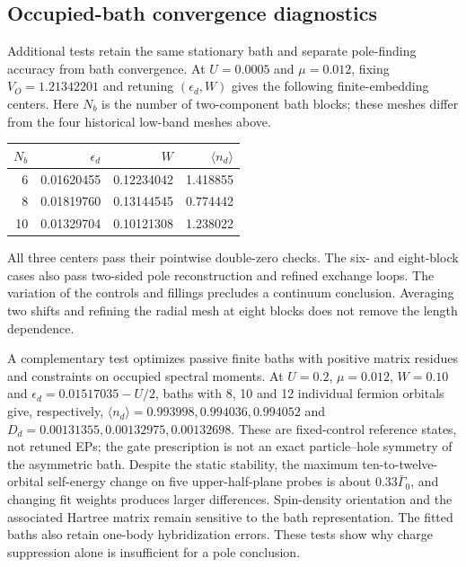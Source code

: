 \documentclass[%
  aps,physrev,onecolumn,10pt,amsmath,amssymb,superscriptaddress,longbibliography,floatfix
]{revtex4-2}
\begin{document}
\subsection{Occupied-bath convergence diagnostics}
\label{app:occupied_bath_checks}
Additional tests retain the same stationary bath and separate pole-finding
accuracy from bath convergence. At $U=0.0005$ and $\mu=0.012$, fixing
$V_O=1.21342201$ and retuning $(\epsilon_d,W)$ gives the following
finite-embedding centers. Here $N_b$ is the number of two-component bath
blocks; these meshes differ from the four historical low-band meshes above.
\begin{center}
\setlength{\tabcolsep}{7pt}
\begin{tabular}{@{}rrrr@{}}
\toprule
$N_b$ & $\epsilon_d$ & $W$ & $\langle n_d\rangle$\\
\midrule
6 & 0.01620455 & 0.12234042 & 1.418855\\
8 & 0.01819760 & 0.13144545 & 0.774442\\
10 & 0.01329704 & 0.10121308 & 1.238022\\
\bottomrule
\end{tabular}
\end{center}
All three centers pass their pointwise double-zero checks. The six- and
eight-block cases also pass two-sided pole reconstruction and refined
exchange loops. The variation of the controls and fillings precludes a
continuum conclusion. Averaging two shifts and refining the radial mesh
at eight blocks does not remove the length dependence.

A complementary test optimizes passive finite baths with positive matrix
residues and constraints on occupied spectral moments. At $U=0.2$,
$\mu=0.012$, $W=0.10$ and $\epsilon_d=0.01517035-U/2$, baths with 8, 10
and 12 individual fermion orbitals give, respectively,
$\langle n_d\rangle=0.993998,0.994036,0.994052$ and
$D_d=0.00131355,0.00132975,0.00132698$. These are fixed-control
reference states, not retuned EPs; the gate prescription is not an exact
particle--hole symmetry of the asymmetric bath. Despite the static
stability, the maximum ten-to-twelve-orbital self-energy change on five
upper-half-plane probes is about $0.33\bar\Gamma_0$, and changing fit
weights produces larger differences. Spin-density orientation and the
associated Hartree matrix remain sensitive to the bath representation.
The fitted baths also retain one-body hybridization errors. These tests
show why charge suppression alone is insufficient for a pole conclusion.
\end{document}
